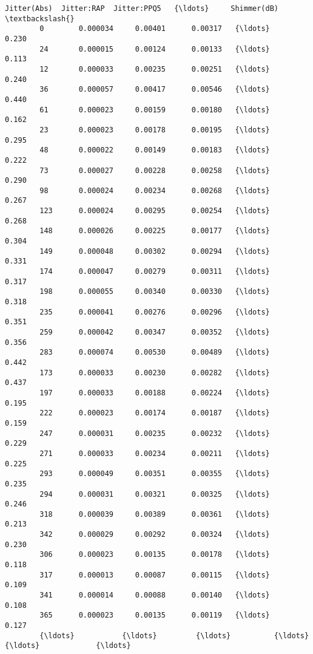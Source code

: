 \documentclass[11pt]{article}
\begin{document}
\begin{Verbatim}[commandchars=\\\{\}]
              Jitter(Abs)  Jitter:RAP  Jitter:PPQ5   {\ldots}     Shimmer(dB)  \textbackslash{}
        0        0.000034     0.00401      0.00317   {\ldots}           0.230   
        24       0.000015     0.00124      0.00133   {\ldots}           0.113   
        12       0.000033     0.00235      0.00251   {\ldots}           0.240   
        36       0.000057     0.00417      0.00546   {\ldots}           0.440   
        61       0.000023     0.00159      0.00180   {\ldots}           0.162   
        23       0.000023     0.00178      0.00195   {\ldots}           0.295   
        48       0.000022     0.00149      0.00183   {\ldots}           0.222   
        73       0.000027     0.00228      0.00258   {\ldots}           0.290   
        98       0.000024     0.00234      0.00268   {\ldots}           0.267   
        123      0.000024     0.00295      0.00254   {\ldots}           0.268   
        148      0.000026     0.00225      0.00177   {\ldots}           0.304   
        149      0.000048     0.00302      0.00294   {\ldots}           0.331   
        174      0.000047     0.00279      0.00311   {\ldots}           0.317   
        198      0.000055     0.00340      0.00330   {\ldots}           0.318   
        235      0.000041     0.00276      0.00296   {\ldots}           0.351   
        259      0.000042     0.00347      0.00352   {\ldots}           0.356   
        283      0.000074     0.00530      0.00489   {\ldots}           0.442   
        173      0.000033     0.00230      0.00282   {\ldots}           0.437   
        197      0.000033     0.00188      0.00224   {\ldots}           0.195   
        222      0.000023     0.00174      0.00187   {\ldots}           0.159   
        247      0.000031     0.00235      0.00232   {\ldots}           0.229   
        271      0.000033     0.00234      0.00211   {\ldots}           0.225   
        293      0.000049     0.00351      0.00355   {\ldots}           0.235   
        294      0.000031     0.00321      0.00325   {\ldots}           0.246   
        318      0.000039     0.00389      0.00361   {\ldots}           0.213   
        342      0.000029     0.00292      0.00324   {\ldots}           0.230   
        306      0.000023     0.00135      0.00178   {\ldots}           0.118   
        317      0.000013     0.00087      0.00115   {\ldots}           0.109   
        341      0.000014     0.00088      0.00140   {\ldots}           0.108   
        365      0.000023     0.00135      0.00119   {\ldots}           0.127   
        {\ldots}           {\ldots}         {\ldots}          {\ldots}   {\ldots}             {\ldots}   

\end{Verbatim}
\end{document}
